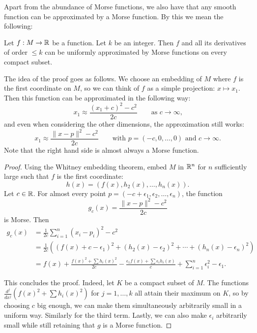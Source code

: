 Apart from the abundance of Morse functions, we also have that any smooth function can be approximated by a Morse function. By this we mean the following:
\begin{prop}
    Let $f: M \to  \mathbb{R}$ be a function.
    Let $k$ be an integer.
    Then $f$ and all its derivatives of order $\le k$ can be uniformly
    approximated by Morse functions on every compact subset.
\end{prop}

The idea of the proof goes as follows.
We choose an embedding of $M$ where $f$ is the first coordinate on $M$, so we can think of $f$ as a simple projection: $x \mapsto x_1$.
Then this function can be approximated in the following way:
\[
    x_1 \approx \frac{(x_1+c)^2 - c^2}{2c} \qquad \text{as $c \to  \infty$,}
\]
and even when considering the other dimensions, the approximation still works:
\[
    x_1 \approx \frac{\|x - p\|^2 - c^2}{2c} \qquad \text{with $p = (-c, 0, \ldots, 0)$ and $c\to  \infty$}
.\] 
Note that the right hand side is almost always a Morse function.

\begin{proof}
    Using the Whitney embedding theorem, embed $M$ in $\mathbb{R}^{n}$ for $n$ sufficiently large such that $f$ is the first coordinate:
    \[
        h(x) = (f(x), h_2(x), \ldots, h_n(x))
    .\] 
    Let $c \in \mathbb{R}$. For almost every point $p = (-c + \epsilon_1, \epsilon_2, \ldots, \epsilon_n)$, the function
    \[
        g_c(x) = \frac{\|x - p\|^2 - c^2}{2c} 
    \] 
    is Morse.
    Then
    \begin{align*}
        g_c(x) &= \frac{1}{2c}  \sum_{i=1}^{n} (x_i - p_i)^2 - c^2\\
             &= \frac{1}{2c} \left((f(x) + c - \epsilon_1 )^2 + (h_2(x) - \epsilon_2)^2 + \cdots + (h_n(x) - \epsilon_n)^2\right)\\
             &= f(x) +  \frac{f(x)^2 + \sum h_i(x)^2}{2c} - \frac{\epsilon_1 f(x)  + \sum \epsilon_i h_i(x)}{c}  + \sum_{i=1}^{n} \epsilon_i^2 - \epsilon_1
    .\end{align*} 

    This concludes the proof.
    Indeed, let $K$ be a compact subset of $M$.
    The functions $\frac{d^{j}}{dx^{j}} (f(x)^2 + \sum h_i(x)^2)$ for $j = 1, \ldots,k$ all attain their maximum on $K$, so by choosing $c$ big enough, we can make them simultaneously arbitrarily small in a uniform way. Similarly for the third term.
    Lastly, we can also make $\epsilon_i$ arbitrarily small while still retaining that $g$ is a Morse function.
\end{proof}

